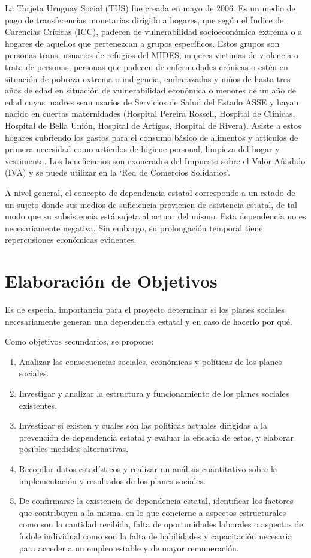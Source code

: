 \documentclass{article}
\begin{document}
La Tarjeta Uruguay Social (TUS) fue creada en mayo de 2006. Es un medio de pago de transferencias monetarias dirigido a hogares, que según el Índice de Carencias Críticas (ICC), padecen de  vulnerabilidad socioeconómica extrema o a hogares de aquellos que pertenezcan a grupos específicos. Estos grupos son personas trans, usuarios de refugios del MIDES, mujeres victimas de violencia o trata de personas, personas que padecen de enfermedades crónicas o estén en situación de pobreza extrema o indigencia, embarazadas y niños de hasta tres años de edad en situación de vulnerabilidad económica o menores de un año de edad cuyas madres sean usarios de Servicios de Salud del Estado ASSE y hayan nacido en cuertas maternidades (Hospital Pereira Rossell, Hospital de Clínicas, Hospital de Bella Unión, Hospital de Artigas, Hospital de Rivera). Asiste a estos hogares cubriendo los gastos para el consumo básico de alimentos y artículos de primera necesidad como artículos de higiene personal, limpieza del hogar y vestimenta.  Los beneficiarios son exonerados  del Impuesto sobre el Valor Añadido (IVA) y se puede utilizar en la `Red de Comercios Solidarios'.

A nivel general, el concepto de dependencia estatal corresponde a un estado de un sujeto donde sus medios de suficiencia provienen de asistencia estatal, de tal modo que su subsistencia está sujeta al actuar del mismo. Esta dependencia no es necesariamente negativa. Sin embargo, su prolongación temporal tiene repercusiones económicas evidentes.

\section{Elaboración de Objetivos}

Es de especial importancia para el proyecto determinar si los planes sociales necesariamente generan una dependencia estatal y en caso de hacerlo por qué.

Como objetivos secundarios, se propone:

\begin{enumerate}
	\item Analizar las consecuencias sociales, económicas y políticas de los planes sociales. 
	\item Investigar y analizar la estructura y funcionamiento de los planes sociales existentes.
	\item Investigar si existen y cuales son las políticas actuales dirigidas a la prevención de dependencia estatal y evaluar la eficacia de estas, y elaborar posibles medidas alternativas.
	\item Recopilar datos estadísticos y realizar un análisis cuantitativo sobre la implementación y resultados de los planes sociales.
	\item De confirmarse la existencia de dependencia estatal, identificar los factores que contribuyen a la misma, en lo que concierne a aspectos estructurales como son la cantidad recibida, falta de oportunidades laborales o aspectos de índole individual como son la falta de habilidades y capacitación necesaria para acceder a un empleo estable y de mayor remuneración.
\end{enumerate}
\end{document}
